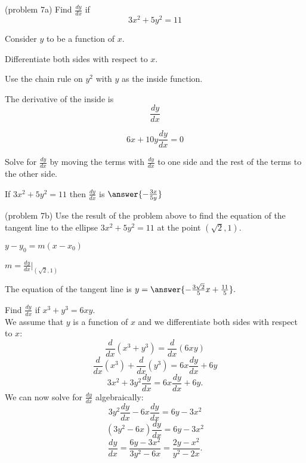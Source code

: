 \documentclass[handout]{ximera}
\begin{document}
\begin{center}
\begin{foldable}
\end{foldable}
\end{center}


\begin{problem}(problem 7a)
  Find $\frac{dy}{dx}$ if
  \[
  3x^2 + 5y^2 = 11
  \]
  
	  
    \begin{hint}
      Consider $y$ to be a function of $x$.
    \end{hint}
		\begin{hint}
		  Differentiate both sides with respect to $x$.
		\end{hint}
    \begin{hint}
      Use the chain rule on $y^2$ with $y$ as the inside function.
    \end{hint}
    \begin{hint}
      The derivative of the inside is 
      \[
      \frac{dy}{dx}
      \]
    \end{hint}
		\begin{hint}
		  \[
			6x + 10y\frac{dy}{dx} = 0
			\]
		\end{hint}
		\begin{hint}
		  Solve for $\frac{dy}{dx}$ by moving the terms with $\frac{dy}{dx}$ to one side and the 
			rest of the terms to the other side.
		\end{hint}
    
		If $3x^2 + 5y^2 = 11$ then $\frac{dy}{dx}$ is
		 $\answer{-\frac{3x}{5y}}$
		
\end{problem}


\begin{problem}(problem 7b)
Use the result of the problem above to find the equation of the tangent line to the ellipse $3x^2 + 5y^2 = 11$ at the point $(\sqrt 2,1).$

\begin{hint}
$y-y_0 = m(x-x_0)$
\end{hint}
\begin{hint}
$m = \frac{dy}{dx}\bigg|_{(\sqrt 2, 1)}$
\end{hint}
The equation of the tangent line is $y = \answer{-\frac{3\sqrt 2}{5} x + \frac{11}{5}}.$
\end{problem}



\begin{example}[example 8]
Find  $\frac{dy}{dx}$ if $x^3 + y^3 =6xy$.\\
We assume that $y$ is a function of $x$ and we differentiate both 
sides with respect to $x$:
\[\frac{d}{dx}(x^3 + y^3)  = \frac{d}{dx} (6xy)\]
\[\frac{d}{dx}(x^3) + \frac{d}{dx}(y^3)  = 6x\frac{dy}{dx} + 6y\]
\[3x^2 + 3y^2\frac{dy}{dx}  = 6x\frac{dy}{dx} + 6y.\]
We can now solve for $\displaystyle{\frac{dy}{dx}}$ algebraically:
\[3y^2\frac{dy}{dx}  - 6x\frac{dy}{dx} = 6y-3x^2\]
\[(3y^2- 6x)\frac{dy}{dx}   = 6y-3x^2\]
\[\frac{dy}{dx}   = \frac{6y-3x^2}{3y^2- 6x} = \frac{2y-x^2}{y^2- 2x}.\]
\end{example}
\end{document}
